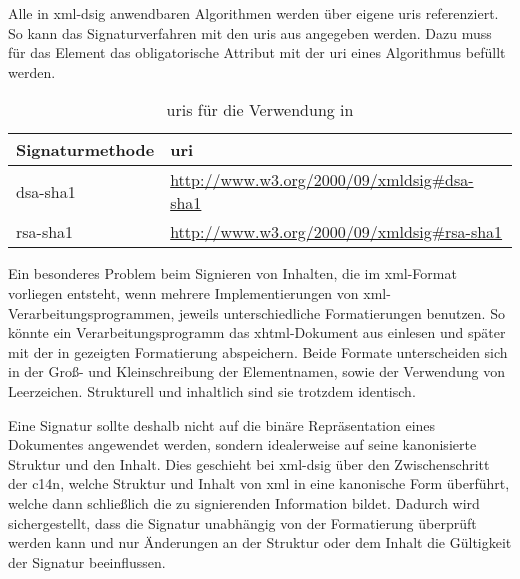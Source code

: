 Alle in \gls{xml-dsig} anwendbaren Algorithmen werden über eigene \glspl{uri} referenziert. So kann das Signaturverfahren mit den \glspl{uri} aus
 angegeben werden. Dazu muss für das Element  das obligatorische Attribut
 mit der \gls{uri} eines Algorithmus befüllt werden.

\begin{table}
    \centering
    \begin{tabularx}{\textwidth}{ l X }
        Signaturmethode & \gls{uri} \\
        \hline
        \hline
        \gls{dsa}-\gls{sha1} & \url{http://www.w3.org/2000/09/xmldsig\#dsa-sha1} \\
        \hline
        \gls{rsa}-\gls{sha1} & \url{http://www.w3.org/2000/09/xmldsig\#rsa-sha1} \\
        \hline
    \end{tabularx}
    \caption{\protect\glspl{uri} für die Verwendung in }
    \label{tab:xml-dsig-signature-method-uri}
\end{table}




Ein besonderes Problem beim Signieren von Inhalten, die im \gls{xml}-Format vorliegen entsteht, wenn mehrere Implementierungen von
\gls{xml}-Verarbeitungsprogrammen, jeweils unterschiedliche Formatierungen benutzen. So könnte ein Verarbeitungsprogramm das \gls{xhtml}-Dokument aus
 einlesen und später mit der in  gezeigten Formatierung abspeichern. Beide Formate unterscheiden sich
in der Groß- und Kleinschreibung der Elementnamen, sowie der Verwendung von Leerzeichen. Strukturell und inhaltlich sind sie trotzdem identisch.

Eine Signatur sollte deshalb nicht auf die binäre Repräsentation eines Dokumentes angewendet werden, sondern idealerweise auf seine kanonisierte
Struktur und den Inhalt. Dies geschieht bei \gls{xml-dsig} über den Zwischenschritt der \gls{c14n}, welche Struktur und Inhalt von \gls{xml} in eine kanonische Form überführt,
welche dann schließlich die zu signierenden Information bildet. Dadurch wird sichergestellt, dass die Signatur unabhängig von der Formatierung überprüft werden
kann und nur Änderungen an der Struktur oder dem Inhalt die Gültigkeit der Signatur beeinflussen. 

